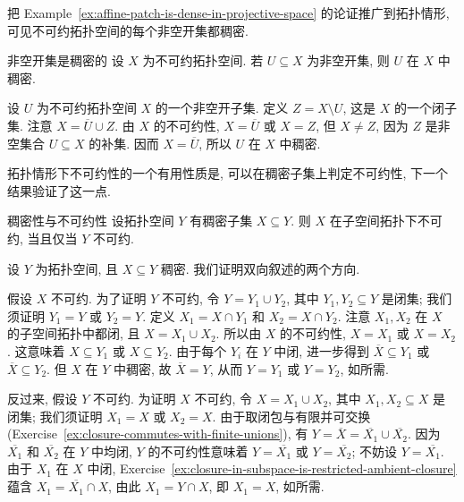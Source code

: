 把 Example~\ref{ex:affine-patch-is-dense-in-projective-space} 的论证推广到拓扑情形, 可见不可约拓扑空间的每个非空开集都稠密.

\begin{Proposition}{非空开集是稠密的}\leavevmode\label{prop:nonempty-open-in-irreducible-space-is-dense}
设 $X$ 为不可约拓扑空间. 若 $U\subseteq X$ 为非空开集, 则 $U$ 在 $X$ 中稠密.
\end{Proposition}
\begin{Proof}
设 $U$ 为不可约拓扑空间 $X$ 的一个非空开子集. 定义 $Z=X\setminus U$, 这是 $X$ 的一个闭子集. 注意 $X=\overline{U}\cup Z$. 由 $X$ 的不可约性, $X=\overline{U}$ 或 $X=Z$, 但 $X\ne Z$, 因为 $Z$ 是非空集合 $U\subseteq X$ 的补集. 因而 $X=\overline{U}$, 所以 $U$ 在 $X$ 中稠密.
\end{Proof}

拓扑情形下不可约性的一个有用性质是, 可以在稠密子集上判定不可约性, 下一个结果验证了这一点.

\begin{Proposition}{稠密性与不可约性}\leavevmode\label{prop:dense-subspace-irreducible-iff-ambient}
设拓扑空间 $Y$ 有稠密子集 $X\subseteq Y$. 则 $X$ 在子空间拓扑下不可约, 当且仅当 $Y$ 不可约.
\end{Proposition}
\begin{Proof}
设 $Y$ 为拓扑空间, 且 $X\subseteq Y$ 稠密. 我们证明双向叙述的两个方向.

假设 $X$ 不可约. 为了证明 $Y$ 不可约, 令 $Y=Y_{1}\cup Y_{2}$, 其中 $Y_{1},Y_{2}\subseteq Y$ 是闭集; 我们须证明 $Y_{1}=Y$ 或 $Y_{2}=Y$. 定义 $X_{1}=X\cap Y_{1}$ 和 $X_{2}=X\cap Y_{2}$. 注意 $X_{1},X_{2}$ 在 $X$ 的子空间拓扑中都闭, 且 $X=X_{1}\cup X_{2}$. 所以由 $X$ 的不可约性, $X=X_{1}$ 或 $X=X_{2}$. 这意味着 $X\subseteq Y_{1}$ 或 $X\subseteq Y_{2}$. 由于每个 $Y_{i}$ 在 $Y$ 中闭, 进一步得到 $\overline{X}\subseteq Y_{1}$ 或 $\overline{X}\subseteq Y_{2}$. 但 $X$ 在 $Y$ 中稠密, 故 $\overline{X}=Y$, 从而 $Y=Y_{1}$ 或 $Y=Y_{2}$, 如所需.

反过来, 假设 $Y$ 不可约. 为证明 $X$ 不可约, 令 $X=X_{1}\cup X_{2}$, 其中 $X_{1},X_{2}\subseteq X$ 是闭集; 我们须证明 $X_{1}=X$ 或 $X_{2}=X$. 由于取闭包与有限并可交换 (Exercise~\ref{ex:closure-commutes-with-finite-unions}), 有 $Y=\overline{X}=\overline{X_{1}}\cup\overline{X_{2}}$. 因为 $\overline{X_{1}}$ 和 $\overline{X_{2}}$ 在 $Y$ 中均闭, $Y$ 的不可约性意味着 $Y=\overline{X_{1}}$ 或 $Y=\overline{X_{2}}$; 不妨设 $Y=\overline{X_{1}}$. 由于 $X_{1}$ 在 $X$ 中闭, Exercise~\ref{ex:closure-in-subspace-is-restricted-ambient-closure} 蕴含 $X_{1}=\overline{X_{1}}\cap X$, 由此 $X_{1}=Y\cap X$, 即 $X_{1}=X$, 如所需.
\end{Proof}

